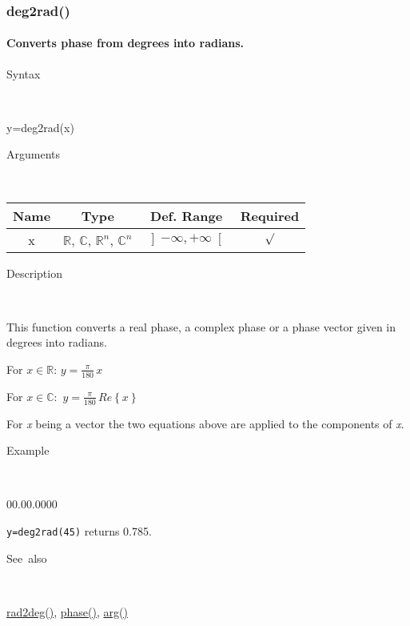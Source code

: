 \newpage
\subsubsection*{\hypertarget{deg2rad}{}{\Large deg2rad()}}


\paragraph{\label{par:deg2rad}Converts phase from degrees into radians.}

\begin{description}
\item [Syntax]~
\end{description}
y=deg2rad(x)

\begin{description}
\item [Arguments]~
\end{description}
\begin{tabular}{|c|c|c|c|}
\hline 
Name&
Type&
Def. Range&
Required\tabularnewline
\hline
\hline 
x&
$\mathbb{R}$, $\mathbb{C}$, $\mathbb{R}^{n}$, $\mathbb{C}^{n}$ &
$\left]-\infty,+\infty\right[$&
$\surd$\tabularnewline
\hline
\end{tabular}

\begin{description}
\item [Description]~
\end{description}
This function converts a real phase, a complex phase or a phase vector
given in degrees into radians. 

\medskip{}
For $x\in\mathbb{R}$: $y={\displaystyle \frac{\pi}{180}}\, x$
\medskip{}

For $x\mathbb{\mathbb{\in C}}:$ $y={\displaystyle \frac{\pi}{180}}\, Re\left\{ x\right\} $
\medskip{}

For \textit{x} being a vector the two equations above are
applied to the components of \textit{x}.

\begin{description}
\item [Example]~
\end{description}
\begin{lyxlist}{00.00.0000}
\item [\texttt{y=deg2rad(45)}]returns 0.785.
\end{lyxlist}
\begin{description}
\item [See~also]~
\end{description}
\textcolor{blue}{\hyperlink{rad2deg}{rad2deg()}}, \textcolor{blue}{\hyperlink{phase}{phase()}},
\textcolor{blue}{\hyperlink{arg}{arg()}}


